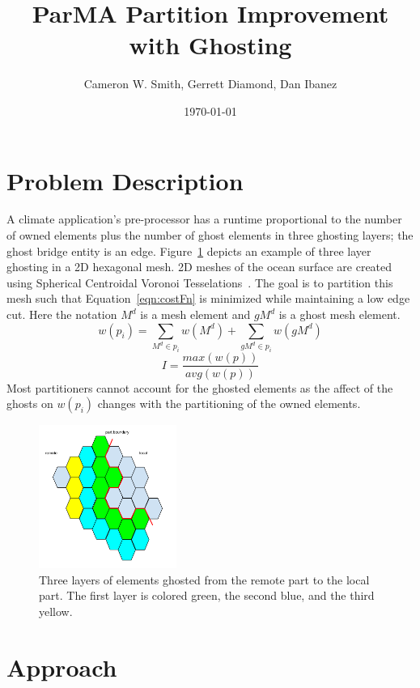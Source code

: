 \documentclass[a4paper]{article}
\title{ParMA Partition Improvement with Ghosting}
\author{Cameron W. Smith, Gerrett Diamond, Dan Ibanez}
\date{\today}
\begin{document}
\maketitle

\section{Problem Description}

A climate application's pre-processor has a runtime proportional to the number
of owned elements plus the number of ghost elements in three ghosting layers;
the ghost bridge entity is an edge.
Figure~\ref{fig:ghostEx} depicts an example of three layer ghosting in a
2D hexagonal mesh.
2D meshes of the ocean surface are created using Spherical Centroidal Voronoi
Tesselations~\cite{JuRingler2011,ringler2008}.
The goal is to partition this mesh such that Equation~\ref{eqn:costFn} is
minimized while maintaining a low edge cut.
Here the notation $M^d$ is a mesh element and $gM^d$ is a ghost mesh element.
\begin{equation}
\label{eqn:weightVoroni}
w(p_i) = \sum_{M^d \in p_i}w(M^d) + \sum_{gM^d \in p_i}w(gM^d)
\end{equation}
\begin{equation}
\label{eqn:costFn}
I = \frac{max(w(p))}{avg(w(p))}
\end{equation}
Most partitioners cannot account for the ghosted elements as the affect of the
ghosts on $w(p_i)$ changes with the partitioning of the owned elements.

\begin{figure}
\centering
\includegraphics[width=0.4\textwidth]{ghostingExample.png}
\caption{\label{fig:ghostEx}
  Three layers of elements ghosted from the remote part to the local part.
  The first layer is colored green, the second blue, and the third yellow.
}
\end{figure}

\section{Approach}
\end{document}
